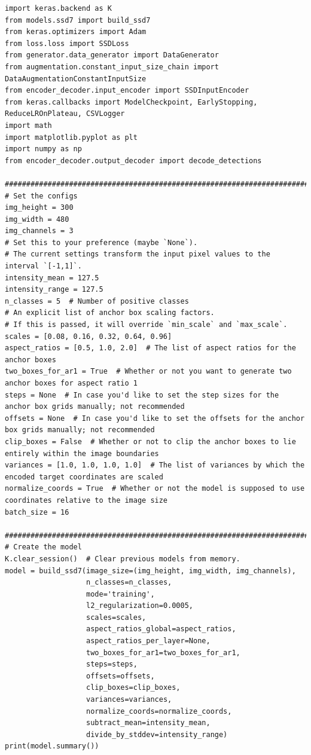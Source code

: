 \begin{lstlisting}
import keras.backend as K
from models.ssd7 import build_ssd7
from keras.optimizers import Adam
from loss.loss import SSDLoss
from generator.data_generator import DataGenerator
from augmentation.constant_input_size_chain import DataAugmentationConstantInputSize
from encoder_decoder.input_encoder import SSDInputEncoder
from keras.callbacks import ModelCheckpoint, EarlyStopping, ReduceLROnPlateau, CSVLogger
import math
import matplotlib.pyplot as plt
import numpy as np
from encoder_decoder.output_decoder import decode_detections

########################################################################################################################
# Set the configs
img_height = 300
img_width = 480
img_channels = 3
# Set this to your preference (maybe `None`).
# The current settings transform the input pixel values to the interval `[-1,1]`.
intensity_mean = 127.5
intensity_range = 127.5
n_classes = 5  # Number of positive classes
# An explicit list of anchor box scaling factors.
# If this is passed, it will override `min_scale` and `max_scale`.
scales = [0.08, 0.16, 0.32, 0.64, 0.96]
aspect_ratios = [0.5, 1.0, 2.0]  # The list of aspect ratios for the anchor boxes
two_boxes_for_ar1 = True  # Whether or not you want to generate two anchor boxes for aspect ratio 1
steps = None  # In case you'd like to set the step sizes for the anchor box grids manually; not recommended
offsets = None  # In case you'd like to set the offsets for the anchor box grids manually; not recommended
clip_boxes = False  # Whether or not to clip the anchor boxes to lie entirely within the image boundaries
variances = [1.0, 1.0, 1.0, 1.0]  # The list of variances by which the encoded target coordinates are scaled
normalize_coords = True  # Whether or not the model is supposed to use coordinates relative to the image size
batch_size = 16

########################################################################################################################
# Create the model
K.clear_session()  # Clear previous models from memory.
model = build_ssd7(image_size=(img_height, img_width, img_channels),
                   n_classes=n_classes,
                   mode='training',
                   l2_regularization=0.0005,
                   scales=scales,
                   aspect_ratios_global=aspect_ratios,
                   aspect_ratios_per_layer=None,
                   two_boxes_for_ar1=two_boxes_for_ar1,
                   steps=steps,
                   offsets=offsets,
                   clip_boxes=clip_boxes,
                   variances=variances,
                   normalize_coords=normalize_coords,
                   subtract_mean=intensity_mean,
                   divide_by_stddev=intensity_range)
print(model.summary())


\end{lstlisting}
